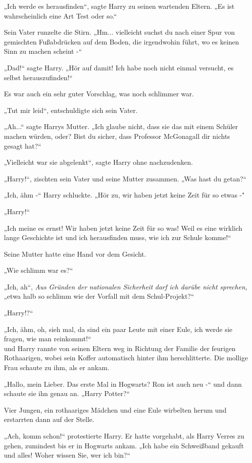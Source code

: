 {„Ich werde es herausfinden“, sagte Harry zu seinen wartenden Eltern. „Es ist wahrscheinlich eine Art Test oder so.“

Sein Vater runzelte die Stirn. „Hm... vielleicht suchst du nach einer Spur von gemischten Fußabdrücken auf dem Boden, die irgendwohin führt, wo es keinen Sinn zu machen scheint -“

„Dad!“ sagte Harry. „Hör auf damit! Ich habe noch nicht einmal versucht, es selbst herauszufinden!“

Es war auch ein sehr guter Vorschlag, was noch schlimmer war.

„Tut mir leid“, entschuldigte sich sein Vater.

„Ah...“ sagte Harrys Mutter. „Ich glaube nicht, dass sie das mit einem Schüler machen würden, oder? Bist du sicher, dass Professor McGonagall dir nichts gesagt hat?“

„Vielleicht war sie abgelenkt“, sagte Harry ohne nachzudenken.

„Harry!“, zischten sein Vater und seine Mutter zusammen. „Was hast du getan?“

„Ich, ähm -“ Harry schluckte. „Hör zu, wir haben jetzt keine Zeit für so etwas -"

„Harry!“

„Ich meine es ernst! Wir haben jetzt keine Zeit für so was! Weil es eine wirklich lange Geschichte ist und ich herausfinden muss, wie ich zur Schule komme!“

Seine Mutter hatte eine Hand vor dem Gesicht.

„Wie schlimm war es?“

„Ich, ah“, \emph{Aus Gründen der nationalen Sicherheit darf ich darübe nicht sprechen,} „etwa halb so schlimm wie der Vorfall mit dem Schul-Projekt?“

„Harry!?“

„Ich, ähm, oh, sieh mal, da sind ein paar Leute mit einer Eule, ich werde sie fragen, wie man reinkommt!“\\ und Harry rannte von seinen Eltern weg in Richtung der Familie der feurigen Rothaarigen, wobei sein Koffer automatisch hinter ihm herschlitterte. Die mollige Frau schaute zu ihm, als er ankam.

„Hallo, mein Lieber. Das erste Mal in Hogwarts? Ron ist auch neu -“ und dann schaute sie ihn genau an. „Harry Potter?“

Vier Jungen, ein rothaariges Mädchen und eine Eule wirbelten herum und erstarrten dann auf der Stelle.

„Ach, komm schon!“ protestierte Harry. Er hatte vorgehabt, als Harry Verres zu gehen, zumindest bis er in Hogwarts ankam. „Ich habe ein Schweißband gekauft und alles! Woher wissen Sie, wer ich bin?“

}
